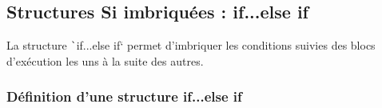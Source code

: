 \documentclass[10pt]{article}
\begin{document}
\label{ifElseSansAccolades}

\subsection{Structures Si imbriquées : if...else if}
La structure \texttt`if...else if` permet d'imbriquer les conditions suivies des blocs d'exécution les uns à la suite des autres.

\subsubsection{Définition d'une structure if...else if}

\smallskip
\end{document}
